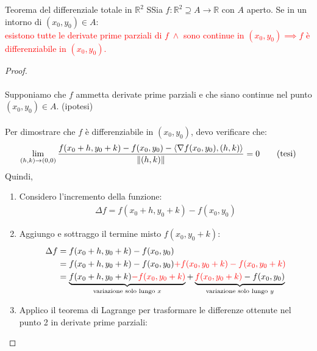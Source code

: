 \documentclass{article}  %
\begin{document}
\begin{theorem}{Teorema del differenziale totale in $\mathbb{R}^2$}
	SSia $f: \mathbb{R}^2 \supseteq A \to \mathbb{R}$ con $A$ aperto. Se in un intorno di $(x_0,y_0) \in A$: \\
	\textcolor{red}{esistono tutte le derivate
		prime parziali di $f \; \land$  sono continue in $(x_0,y_0) \implies f$ è differenziabile in $(x_0,y_0)$.}
	\begin{proof}  \\ \\
		Supponiamo che $f$ ammetta derivate prime parziali e che siano continue nel punto \\  $(x_0, y_0) \in A$. \hfill(ipotesi) \\ \\
		Per dimostrare che $f$ è differenziabile in $(x_0, y_0)$, devo verificare che:
		\begin{align*}
			\lim_{(h,k) \to (0,0)} \frac{f(x_0+h,y_0+k)-f(x_0,y_0)- \langle \nabla f(x_0,y_0), (h,k)\rangle}{\|(h,k)\|} = 0  \tag*{(\text{tesi})}
		\end{align*}
		Quindi,
		\begin{enumerate}
			\item Considero l'incremento della funzione:
			      \begin{align*}
				      \Delta f = f(x_0+h, y_0+k)-f(x_0,y_0)
			      \end{align*}
			\item Aggiungo e sottraggo il termine misto $f(x_0, y_0+k)$:
			      \begin{align*}
				      \Delta f & = f(x_0+h, y_0+k)-f(x_0,y_0)                                                                                                                                                                \\
				               & = f(x_0+h, y_0+k)-f(x_0,y_0) \textcolor{red}{+f(x_0, y_0+k)-f(x_0, y_0+k)}                                                                                                                  \\
				               & = \underbrace{f(x_0+h, y_0+k)\textcolor{red}{-f(x_0, y_0+k)}}_{\text{variazione solo lungo } x} + \underbrace{\textcolor{red}{f(x_0, y_0+k)} -f(x_0,y_0)}_{\text{variazione solo lungo } y}
			      \end{align*}
			\item Applico il teorema di Lagrange per trasformare le differenze ottenute nel punto 2 in derivate prime parziali: \\

\end{enumerate}
\end{proof}
\end{theorem}
\end{document}
